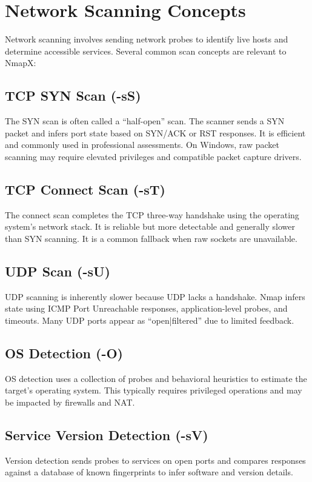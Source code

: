 \documentclass[12pt, a4paper]{report}
\newcommand{\NmapX}{NmapX}
\begin{document}
\section{Network Scanning Concepts}
Network scanning involves sending network probes to identify live hosts and determine accessible services. Several common scan concepts are relevant to \NmapX:

\subsection{TCP SYN Scan (-sS)}
The SYN scan is often called a ``half-open'' scan. The scanner sends a SYN packet and infers port state based on SYN/ACK or RST responses. It is efficient and commonly used in professional assessments. On Windows, raw packet scanning may require elevated privileges and compatible packet capture drivers.

\subsection{TCP Connect Scan (-sT)}
The connect scan completes the TCP three-way handshake using the operating system's network stack. It is reliable but more detectable and generally slower than SYN scanning. It is a common fallback when raw sockets are unavailable.

\subsection{UDP Scan (-sU)}
UDP scanning is inherently slower because UDP lacks a handshake. Nmap infers state using ICMP Port Unreachable responses, application-level probes, and timeouts. Many UDP ports appear as ``open|filtered'' due to limited feedback.

\subsection{OS Detection (-O)}
OS detection uses a collection of probes and behavioral heuristics to estimate the target's operating system. This typically requires privileged operations and may be impacted by firewalls and NAT.

\subsection{Service Version Detection (-sV)}
Version detection sends probes to services on open ports and compares responses against a database of known fingerprints to infer software and version details.
\end{document}
